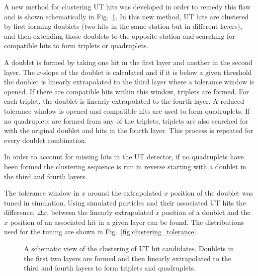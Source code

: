 A new method for clustering UT hits was developed in order to remedy this flaw and is shown schematically in Fig.~\ref{fig:clustering}. In this new method, UT hits are clustered by first forming doublets (two hits in the same station but in different layers), and then extending those doublets to the opposite station and searching for compatible hits to form triplets or quadruplets. 
 
A doublet is formed by taking one hit in the first layer and another in the second layer. The $x$-slope of the doublet is calculated and if it is below a given threshold the doublet is linearly extrapolated to the third layer where a tolerance window is opened. If there are compatible hits within this window, triplets are formed. For each triplet, the doublet is linearly extrapolated to the fourth layer. A reduced tolerance window is opened and compatible hits are used to form quadruplets. If no quadruplets are formed from any of the triplets, triplets are also searched for with the original doublet and hits in the fourth layer. This process is repeated for every doublet combination.
 
In order to account for missing hits in the UT detector, if no quadruplets have been formed the clustering sequence is run in reverse starting with a doublet in the third and fourth layers.
 
The tolerance window in $x$ around the extrapolated $x$ position of the doublet was tuned in simulation. Using simulated particles and their associated UT hits the difference, $\Delta x$, between the linearly extrapolated $x$ position of a doublet and the $x$ position of an associated hit in a given layer can be found. The distributions used for the tuning are shown in Fig.~\ref{fig:clustering_tolerance}.

\begin{figure}[!tb]
 \begin{center}

\caption{A schematic view of the clustering of UT hit candidates. Doublets in the first two layers are formed and then linearly extrapolated to the third and fourth layers to form triplets and quadruplets.}
\label{fig:clustering}
\end{center}
\end{figure}

